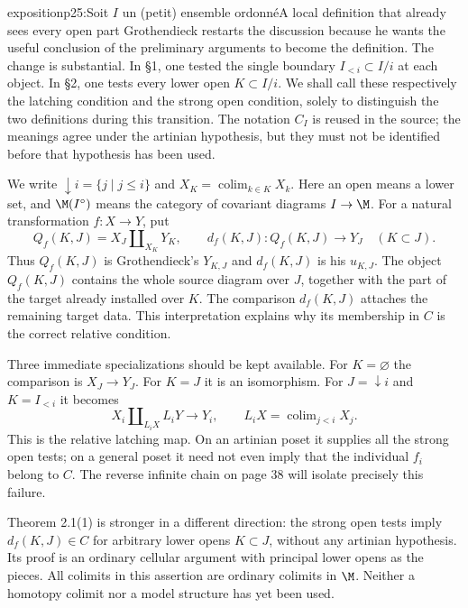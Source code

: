 \begin{dcomment}{exposition}{p25:Soit $I$ un (petit) ensemble ordonné}{A local definition that already sees every open part}
Grothendieck restarts the discussion because he wants the useful conclusion of the preliminary arguments to become the definition. The change is substantial. In \S1, one tested the single boundary $I_{<i}\subset I/i$ at each object. In \S2, one tests every lower open $K\subset I/i$. We shall call these respectively the latching condition and the strong open condition, solely to distinguish the two definitions during this transition. The notation $C_I$ is reused in the source; the meanings agree under the artinian hypothesis, but they must not be identified before that hypothesis has been used.

We write $\downarrow i=\{j\mid j\leq i\}$ and $X_K=\operatorname{colim}_{k\in K}X_k$. Here an open means a lower set, and $\M(I^\circ)$ means the category of covariant diagrams $I\to\M$. For a natural transformation $f:X\to Y$, put
\[
 Q_f(K,J)=X_J\amalg_{X_K}Y_K,
 \qquad d_f(K,J):Q_f(K,J)\longrightarrow Y_J
 \quad(K\subset J).
\]
Thus $Q_f(K,J)$ is Grothendieck's $Y_{K,J}$ and $d_f(K,J)$ is his $u_{K,J}$. The object $Q_f(K,J)$ contains the whole source diagram over $J$, together with the part of the target already installed over $K$. The comparison $d_f(K,J)$ attaches the remaining target data. This interpretation explains why its membership in $C$ is the correct relative condition.

Three immediate specializations should be kept available. For $K=\varnothing$ the comparison is $X_J\to Y_J$. For $K=J$ it is an isomorphism. For $J=\downarrow i$ and $K=I_{<i}$ it becomes
\[
 X_i\amalg_{L_iX}L_iY\longrightarrow Y_i,
 \qquad L_iX=\operatorname{colim}_{j<i}X_j.
\]
This is the relative latching map. On an artinian poset it supplies all the strong open tests; on a general poset it need not even imply that the individual $f_i$ belong to $C$. The reverse infinite chain on page 38 will isolate precisely this failure.

Theorem 2.1(1) is stronger in a different direction: the strong open tests imply $d_f(K,J)\in C$ for arbitrary lower opens $K\subset J$, without any artinian hypothesis. Its proof is an ordinary cellular argument with principal lower opens as the pieces. All colimits in this assertion are ordinary colimits in $\M$. Neither a homotopy colimit nor a model structure has yet been used.
\end{dcomment}

